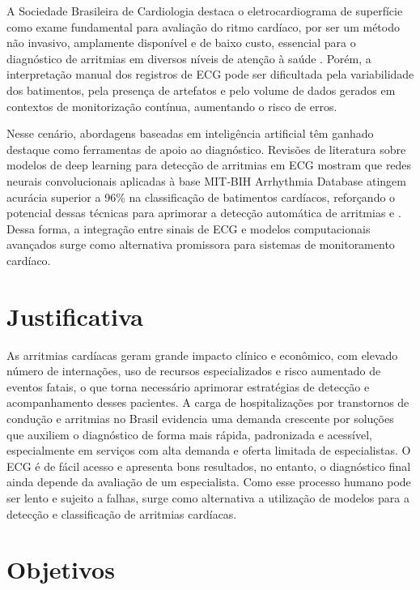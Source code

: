 A Sociedade Brasileira de Cardiologia destaca o eletrocardiograma de superfície como exame fundamental para avaliação do ritmo cardíaco, 
por ser um método não invasivo, amplamente disponível e de baixo custo, essencial para o diagnóstico de arritmias em diversos níveis de 
atenção à saúde . Porém, a interpretação manual dos registros de ECG pode ser dificultada pela variabilidade dos batimentos, 
pela presença de artefatos e pelo volume de dados gerados em contextos de monitorização contínua, aumentando 
o risco de erros.

Nesse cenário, abordagens baseadas em inteligência artificial têm ganhado destaque como ferramentas de apoio ao diagnóstico. Revisões de 
literatura sobre modelos de deep learning para detecção de arritmias em ECG mostram que redes neurais convolucionais aplicadas à base MIT‑BIH 
Arrhythmia Database atingem acurácia superior a 96\% na classificação de batimentos cardíacos, reforçando o potencial dessas técnicas 
para aprimorar a detecção automática de arritmias  e . Dessa forma, a integração entre sinais de ECG e 
modelos computacionais avançados surge como alternativa promissora para sistemas de monitoramento cardíaco.

\section{Justificativa}

As arritmias cardíacas geram grande impacto clínico e econômico, com elevado número de internações, uso de recursos especializados e risco 
aumentado de eventos fatais, o que torna necessário aprimorar estratégias de detecção e acompanhamento desses pacientes. A carga de hospitalizações 
por transtornos de condução e arritmias no Brasil evidencia uma demanda crescente por soluções que auxiliem o diagnóstico de forma mais rápida, 
padronizada e acessível, especialmente em serviços com alta demanda e oferta limitada de especialistas. O ECG é de fácil acesso e apresenta bons
resultados, no entanto, o diagnóstico final ainda depende da avaliação de um especialista. Como esse processo humano pode ser lento e sujeito a 
falhas, surge como alternativa a utilização de modelos para a detecção e classificação de arritmias cardíacas. 

\section{Objetivos}

